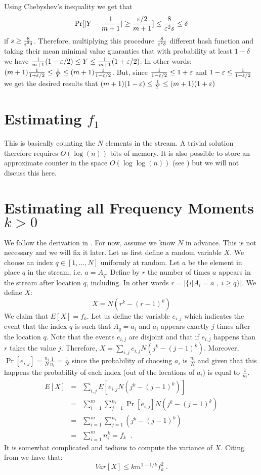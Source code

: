 \documentclass{article}
\begin{document}
Using Chebyshev's inequality we get that 
\[
\Pr[|Y - \frac{1}{m+1}| \ge \frac{\varepsilon/2}{m+1}] \le \frac{8}{\varepsilon^2 s} \le \delta
\] 
if $s \ge \frac{8}{\varepsilon^2 \delta}$. Therefore, multiplying this procedure $\frac{8}{\varepsilon^2 \delta}$ different 
hash function and taking their mean minimal value guaranties that with probability at least $1-\delta$ we have
$\frac{1}{m+1}(1-\varepsilon/2) \le Y \le \frac{1}{m+1}(1+\varepsilon/2)$.
In other words: $(m+1)\frac{1}{1+\varepsilon/2} \le \frac{1}{Y} \le (m+1)\frac{1}{1-\varepsilon/2}$.
But, since $\frac{1}{1-\varepsilon/2} \le 1+ \varepsilon$ and $1- \varepsilon \le \frac{1}{1+\varepsilon/2}$ we get the desired results
that $(m+1)(1-\varepsilon) \le \frac{1}{Y} \le (m+1)(1+\varepsilon)$

\section*{Estimating $f_1$}
This is basically counting the $N$ elements in the stream. A trivial solution therefore requires $O(\log(n))$ bits of memory.
It is also possible to store an approximate counter in the space $O(\log\log(n))$ (see \cite{Flajolet85probabilisticcounting}) but 
we will not discuss this here.


\section*{Estimating all Frequency Moments $k>0$}
We follow the derivation in \cite{AMS96}.
For now, assume we know $N$ in advance. This is not necessary and we will fix it later. 
Let us first define a random variable $X$. We choose an index $q \in [1,\ldots,N]$ uniformly at random.
Let $a$ be the element in place $q$ in the stream, i.e. $a=A_q$. Define by $r$ the number of times $a$ appears in 
the stream after location $q$, including. In other words $r = |\{i | A_i = a \;,\; i\ge q\}|$.
We define $X$:
\[
X = N(r^k - (r-1)^k)
\]
%
We claim that $E[X] = f_k$. Let us define the variable $e_{i,j}$ which indicates the event that 
the index $q$ is such that $A_q = a_i$ and $a_i$ appears exactly $j$ times after the location $q$.
Note that the events $e_{i,j}$ are disjoint and that if $e_{i,j}$ happens than $r$ takes the value $j$. 
Therefore, $X = \sum_{i,j} e_{i,j}N(j^k - (j-1)^k)$. Moreover, $\Pr[e_{i,j}] = \frac{n_{i}}{N}\frac{1}{n_i} = \frac{1}{N}$     
since the probability of choosing $a_i$ is $\frac{n_i}{N}$ and given that this happens the probability of each index
(out of the locations of $a_i$) is equal to $\frac{1}{n_i}$.
\begin{eqnarray*}
E[X] &=& \sum_{i,j} E[e_{i,j}N(j^k - (j-1)^k)]\\
&=&\sum_{i=1}^{m}\sum_{j=1}^{n_i} \Pr[e_{i,j}]N(j^k - (j-1)^k)\\
&=&\sum_{i=1}^{m}\sum_{j=1}^{n_i} (j^k - (j-1)^k)\\
&=&\sum_{i=1}^{m} n_{i}^{k} = f_k \;\; . 
\end{eqnarray*}
%
It is somewhat complicated and tedious to compute the variance of $X$. Citing from \cite{AMS96} we have that:
\[
Var[X] \le km^{1-1/k}f_{k}^{2} \; .
\] 
\end{document}
